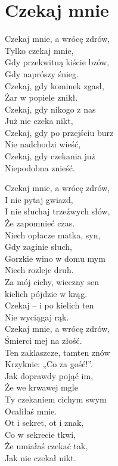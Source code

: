 \section{Czekaj mnie}
\begin{text}
Czekaj mnie, a wrócę zdrów,\\
Tylko czekaj mnie,\\
Gdy przekwitną kiście bzów,\\
Gdy naprószy śnieg.\\
Czekaj, gdy kominek zgasł,\\
Żar w popiele znikł.\\
Czekaj, gdy nikogo z nas\\
Już nie czeka nikt,\\
Czekaj, gdy po przejściu burz\\
Nie nadchodzi wieść,\\
Czekaj, gdy czekania już\\
Niepodobna znieść.

Czekaj mnie, a wrócę zdrów,\\
I nie pytaj gwiazd,\\
I nie słuchaj trzeźwych słów,\\
Że zapomnieć czas.\\
Niech opłacze matka, syn,\\
Gdy zaginie słuch,\\
Gorzkie wino w domu mym\\
Niech rozleje druh.\\
Za mój cichy, wieczny sen\\
kielich pójdzie w krąg.\\
Czekaj – i po kielich ten\\
Nie wyciągaj rąk.\\
Czekaj mnie, a wrócę zdrów,\\
Śmierci mej na złość.\\
Ten zaklaszcze, tamten znów\\
Krzyknie: „Co za gość!”.\\
Jak doprawdy pojąć im,\\
Że we krwawej mgle\\
Ty czekaniem cichym swym\\
Ocaliłaś mnie.\\
Ot i sekret, ot i znak,\\
Co w sekrecie tkwi,\\
Że umiałaś czekać tak,\\
Jak nie czekał nikt.
\end{text}